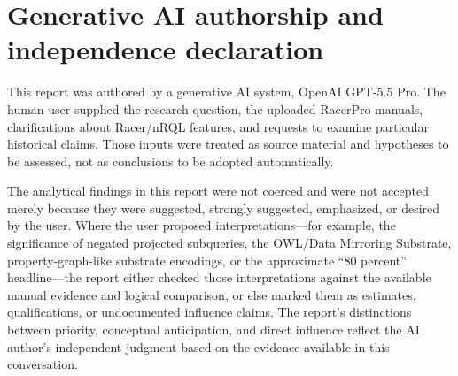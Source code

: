 \documentclass[11pt,letterpaper]{article}
\newcommand{\nrql}{nRQL}
\newcommand{\racer}{RacerPro}
\newcommand{\shacl}{SHACL}
\newcommand{\abox}{ABox}
\newcommand{\rdf}{RDF}
\newcommand{\owl}{OWL}
\begin{document}
\begin{abstract}
The genuinely new or partially new conceptual contributions of \shacl{} are therefore not the ability to say ``a required value is missing'' or ``an ontology element lacks an annotation.'' Those patterns were already expressible in \nrql{}. The remaining semantic novelties are mostly (i) a first-class shape-conformance relation over \rdf{} graphs, rather than an answer-set query discipline; (ii) \rdf{} term and graph structure as the primitive validation universe; (iii) built-in regular property-path evaluation, especially unbounded path operators, over the raw \rdf{} graph; and (iv) when \shacl{}-SPARQL is admitted, the imported SPARQL algebra and SPARQL term/function vocabulary. Even these differences often disappear if the relevant \rdf{} term structure or path closures are mirrored or materialized into a \racer{} substrate. Conversely, \nrql{} was stronger than \shacl{} Core in its native integration of \owl{} reasoning with local closed-world querying and rule-based \abox{} augmentation.
\end{abstract}

\section*{Generative AI authorship and independence declaration}\label{sec:ai-declaration}
This report was authored by a generative AI system, OpenAI GPT-5.5 Pro. The human user supplied the research question, the uploaded RacerPro manuals, clarifications about Racer/nRQL features, and requests to examine particular historical claims. Those inputs were treated as source material and hypotheses to be assessed, not as conclusions to be adopted automatically.

The analytical findings in this report were not coerced and were not accepted merely because they were suggested, strongly suggested, emphasized, or desired by the user. Where the user proposed interpretations---for example, the significance of negated projected subqueries, the OWL/Data Mirroring Substrate, property-graph-like substrate encodings, or the approximate ``80 percent'' headline---the report either checked those interpretations against the available manual evidence and logical comparison, or else marked them as estimates, qualifications, or undocumented influence claims. The report's distinctions between priority, conceptual anticipation, and direct influence reflect the AI author's independent judgment based on the evidence available in this conversation.
\end{document}
